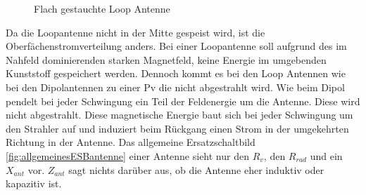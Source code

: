 \begin{figure}[h]
	\begin{center}
	\end{center}
\caption{Flach gestauchte Loop Antenne}
\label{fig:FflacheLoopAntenne}
\end{figure}

Da  die Loopantenne nicht in der Mitte gespeist wird, ist die Oberfächenstromverteilung anders. Bei einer Loopantenne soll aufgrund des im Nahfeld dominierenden starken Magnetfeld, keine Energie im umgebenden Kunststoff gespeichert werden. Dennoch kommt es bei den Loop Antennen wie bei den Dipolantennen zu einer Pv die nicht abgestrahlt wird. Wie beim Dipol pendelt bei jeder Schwingung ein Teil der Feldenergie um die Antenne. Diese wird nicht abgestrahlt. Diese magnetische Energie baut sich bei jeder Schwingung um den Strahler auf und induziert beim Rückgang einen Strom in der umgekehrten Richtung in der Antenne. Das allgemeine Ersatzschaltbild \ref{fig:allgemeinesESBantenne} einer Antenne sieht nur den $R_{v}$, den $R_{rad}$ und ein $X_{ant}$ vor. $Z_{ant}$ sagt nichts darüber aus, ob die Antenne eher induktiv oder kapazitiv ist.

